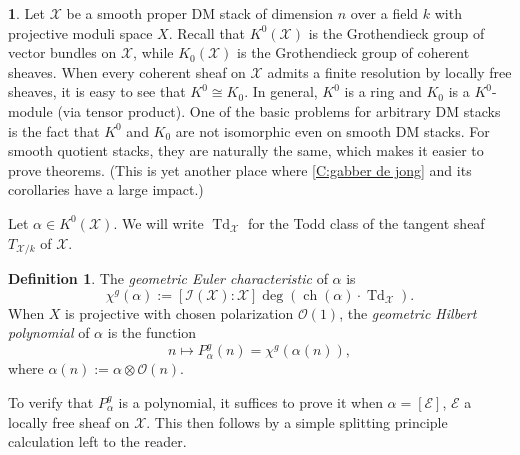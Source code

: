 \documentclass[11pt]{amsart}
\newcommand{\ms}[1]{\mathscr #1}
\newcommand{\td}{\operatorname{Td}}
\DeclareMathOperator{\chern}{ch}
\renewcommand{\[}{[\!\hspace{0.03em}[}
\renewcommand{\]}{]\!\hspace{0.03em}]}
\renewcommand{\(}{(\!\hspace{0.03em}(}
\renewcommand{\)}{)\!\hspace{0.03em})}
\DeclareMathOperator*{\tensor}{\otimes}
\theoremstyle{definition}
\newtheorem{defn}[lem]{Definition}
\newtheorem{para}[lem]{\indent}
\theoremstyle{remark}
\begin{document}
\begin{para}
Let $\ms X$ be a smooth proper DM stack of dimension $n$ over a field $k$ with projective 
moduli space $X$.  Recall that $K^{0}(\ms X)$ is the Grothendieck group of vector 
bundles on $\ms X$, while $K_{0}(\ms X)$ is the Grothendieck group of 
coherent sheaves.  When every coherent sheaf on $\ms X$ admits a 
finite resolution by locally free sheaves, it is easy to see that 
$K^{0}\cong K_{0}$.  In general, $K^{0}$ is a ring and $K_{0}$ is a 
$K^{0}$-module (via tensor product).  
One of the basic problems for arbitrary DM 
stacks is the fact that $K^{0}$ and $K_{0}$ are 
not isomorphic even on smooth DM stacks.  For smooth quotient stacks, they 
are naturally the same, which makes it easier to prove theorems.  (This 
is yet another place where \ref{C:gabber de jong} and its corollaries 
have a large impact.)  

Let $\alpha\in K^{0}(\ms X)$.  We will write $\td_{\ms X}$ for the 
Todd class of the tangent sheaf $T_{\ms X/k}$ of $\ms X$.\end{para}
\begin{defn} The \emph{geometric Euler characteristic\/} of $\alpha$ 
is
$$\chi^{g}(\alpha):=[\ms I(\ms X):\ms X]\deg(\chern(\alpha)\cdot\td_{\ms X}).$$
When $X$ is projective with chosen polarization ${\ms O}(1)$, the 
\emph{geometric Hilbert polynomial\/} of $\alpha$ is the function
$$n\mapsto P^{g}_{\alpha}(n)=\chi^{g}(\alpha(n)),$$
where $\alpha(n):=\alpha\tensor{\ms O}(n)$.
\end{defn}
To verify that $P^{g}_{\alpha}$ is a polynomial, it suffices to prove 
it when $\alpha=[\ms E]$, $\ms E$ a locally free sheaf on $\ms X$.  
This then follows by a simple splitting principle calculation left to 
the reader.
\end{document}
